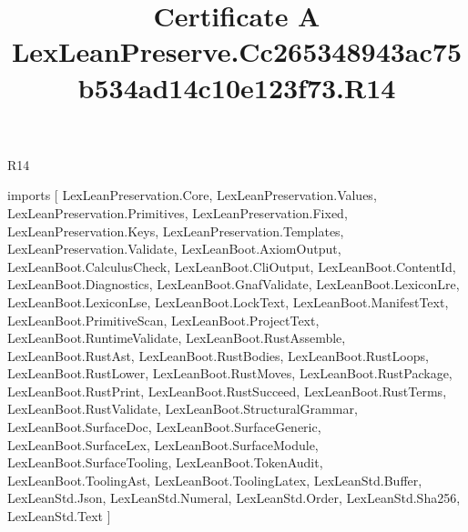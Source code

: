\begin{lexlean}{R14}
\title{Certificate A LexLeanPreserve.Cc265348943ac75b534ad14c10e123f73.R14}
\begin{coremodule}
imports [
  LexLeanPreservation.Core,
  LexLeanPreservation.Values,
  LexLeanPreservation.Primitives,
  LexLeanPreservation.Fixed,
  LexLeanPreservation.Keys,
  LexLeanPreservation.Templates,
  LexLeanPreservation.Validate,
  LexLeanBoot.AxiomOutput,
  LexLeanBoot.CalculusCheck,
  LexLeanBoot.CliOutput,
  LexLeanBoot.ContentId,
  LexLeanBoot.Diagnostics,
  LexLeanBoot.GnafValidate,
  LexLeanBoot.LexiconLre,
  LexLeanBoot.LexiconLse,
  LexLeanBoot.LockText,
  LexLeanBoot.ManifestText,
  LexLeanBoot.PrimitiveScan,
  LexLeanBoot.ProjectText,
  LexLeanBoot.RuntimeValidate,
  LexLeanBoot.RustAssemble,
  LexLeanBoot.RustAst,
  LexLeanBoot.RustBodies,
  LexLeanBoot.RustLoops,
  LexLeanBoot.RustLower,
  LexLeanBoot.RustMoves,
  LexLeanBoot.RustPackage,
  LexLeanBoot.RustPrint,
  LexLeanBoot.RustSucceed,
  LexLeanBoot.RustTerms,
  LexLeanBoot.RustValidate,
  LexLeanBoot.StructuralGrammar,
  LexLeanBoot.SurfaceDoc,
  LexLeanBoot.SurfaceGeneric,
  LexLeanBoot.SurfaceLex,
  LexLeanBoot.SurfaceModule,
  LexLeanBoot.SurfaceTooling,
  LexLeanBoot.TokenAudit,
  LexLeanBoot.ToolingAst,
  LexLeanBoot.ToolingLatex,
  LexLeanStd.Buffer,
  LexLeanStd.Json,
  LexLeanStd.Numeral,
  LexLeanStd.Order,
  LexLeanStd.Sha256,
  LexLeanStd.Text
]


\end{coremodule}
\end{lexlean}
